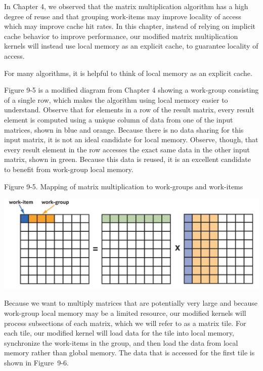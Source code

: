 In Chapter 4, we observed that the matrix multiplication algorithm has a high degree of reuse and that grouping work-items may improve locality of access which may improve cache hit rates. In this chapter, instead of relying on implicit cache behavior to improve performance, our modified matrix multiplication kernels will instead use local memory as an explicit cache, to guarantee locality of access.\par

\begin{tcolorbox}[colback=red!5!white,colframe=red!75!black]
For many algorithms, it is helpful to think of local memory as an explicit cache.
\end{tcolorbox}

Figure 9-5 is a modified diagram from Chapter 4 showing a work-group consisting of a single row, which makes the algorithm using local memory easier to understand. Observe that for elements in a row of the result matrix, every result element is computed using a unique column of data from one of the input matrices, shown in blue and orange. Because there is no data sharing for this input matrix, it is not an ideal candidate for local memory. Observe, though, that every result element in the row accesses the exact same data in the other input matrix, shown in green. Because this data is reused, it is an excellent candidate to benefit from work-group local memory.\par

\hspace*{\fill} \par %
Figure 9-5. Mapping of matrix multiplication to work-groups and work-items
\begin{center}
	\includegraphics[width=1.\textwidth]{content/chapter-9/images/5}
\end{center}

Because we want to multiply matrices that are potentially very large and because work-group local memory may be a limited resource, our modified kernels will process subsections of each matrix, which we will refer to as a matrix tile. For each tile, our modified kernel will load data for the tile into local memory, synchronize the work-items in the group, and then load the data from local memory rather than global memory. The data that is accessed for the first tile is shown in Figure 9-6.\par

